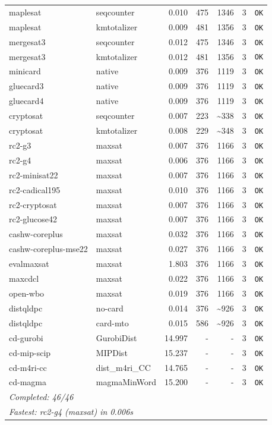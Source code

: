 \begin{longtable}{llrrrl p{}}
maplesat & seqcounter & 0.010 & 475 & 1346 & 3 & \texttt{OK} \\
maplesat & kmtotalizer & 0.009 & 481 & 1356 & 3 & \texttt{OK} \\
mergesat3 & seqcounter & 0.012 & 475 & 1346 & 3 & \texttt{OK} \\
mergesat3 & kmtotalizer & 0.012 & 481 & 1356 & 3 & \texttt{OK} \\
minicard & native & 0.009 & 376 & 1119 & 3 & \texttt{OK} \\
gluecard3 & native & 0.009 & 376 & 1119 & 3 & \texttt{OK} \\
gluecard4 & native & 0.009 & 376 & 1119 & 3 & \texttt{OK} \\
cryptosat & seqcounter & 0.007 & 223 & \textasciitilde{}338 & 3 & \texttt{OK} \\
cryptosat & kmtotalizer & 0.008 & 229 & \textasciitilde{}348 & 3 & \texttt{OK} \\
rc2-g3 & maxsat & 0.007 & 376 & 1166 & 3 & \texttt{OK} \\
rc2-g4 & maxsat & 0.006 & 376 & 1166 & 3 & \texttt{OK} \\
rc2-minisat22 & maxsat & 0.007 & 376 & 1166 & 3 & \texttt{OK} \\
rc2-cadical195 & maxsat & 0.010 & 376 & 1166 & 3 & \texttt{OK} \\
rc2-cryptosat & maxsat & 0.007 & 376 & 1166 & 3 & \texttt{OK} \\
rc2-glucose42 & maxsat & 0.007 & 376 & 1166 & 3 & \texttt{OK} \\
cashw-coreplus & maxsat & 0.032 & 376 & 1166 & 3 & \texttt{OK} \\
cashw-coreplus-mse22 & maxsat & 0.027 & 376 & 1166 & 3 & \texttt{OK} \\
evalmaxsat & maxsat & 1.803 & 376 & 1166 & 3 & \texttt{OK} \\
maxcdcl & maxsat & 0.022 & 376 & 1166 & 3 & \texttt{OK} \\
open-wbo & maxsat & 0.019 & 376 & 1166 & 3 & \texttt{OK} \\
distqldpc & no-card & 0.014 & 376 & \textasciitilde{}926 & 3 & \texttt{OK} \\
distqldpc & card-mto & 0.015 & 586 & \textasciitilde{}926 & 3 & \texttt{OK} \\
cd-gurobi & GurobiDist & 14.997 & - & - & 3 & \texttt{OK} \\
cd-mip-scip & MIPDist & 15.237 & - & - & 3 & \texttt{OK} \\
cd-m4ri-cc & dist\_m4ri\_CC & 14.765 & - & - & 3 & \texttt{OK} \\
cd-magma & magmaMinWord & 15.200 & - & - & 3 & \texttt{OK} \\
\midrule
\multicolumn{7}{l}{\textit{Completed: 46/46}} \\
\multicolumn{7}{l}{\textit{Fastest: rc2-g4 (maxsat) in 0.006s}} \\
\end{longtable}
